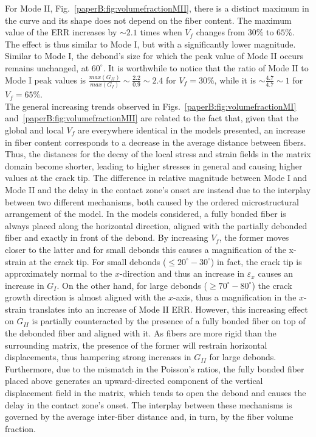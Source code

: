 For Mode II, Fig.~\ref{paperB:fig:volumefractionMII}, there is a distinct maximum in the curve and its shape does not depend on the fiber content. The maximum value of the ERR increases by $\sim 2.1$ times when $V_{f}$ changes from $30\%$ to $65\%$. The effect is thus similar to Mode I, but with a significantly lower magnitude. Similar to Mode I, the debond's size for which the peak value of Mode II occurs remains unchanged, at $60^{\circ}$. It is worthwhile to notice that the ratio of Mode II to Mode I peak values is $\frac{max\left(G_{II}\right)}{max\left(G_{I}\right)}\sim\frac{2.2}{0.9}\sim 2.4$ for $V_{f}=30\%$, while it is $\sim\frac{4.7}{4.7}\sim 1$ for $V_{f}=65\%$.\\%
The general increasing trends observed in Figs.~\ref{paperB:fig:volumefractionMI} and~\ref{paperB:fig:volumefractionMII} are related to the fact that, given that the global and local $V_{f}$ are everywhere identical in the models presented, an increase in fiber content corresponds to a decrease in the average distance between fibers. Thus, the distances for the decay of the local stress and strain fields in the matrix domain become shorter, leading to higher stresses in general and causing higher values at the crack tip. The difference in relative magnitude between Mode I and Mode II and the delay in the contact zone's onset are instead due to the interplay between two different mechanisms, both caused by the ordered microstructural arrangement of the model. In the models considered, a fully bonded fiber is always placed along the horizontal direction, aligned with the partially debonded fiber and exactly in front of the debond. By increasing $V_{f}$, the former moves closer to the latter and for small debonds this causes a magnification of the x-strain at the crack tip. For small debonds ($\leq 20^{\circ}-30^{\circ}$) in fact, the crack tip is approximately normal to the $x$-direction and thus an increase in $\varepsilon_{x}$ causes an increase in $G_{I}$. On the other hand, for large debonds ($\geq 70^{\circ}-80^{\circ}$) the crack growth direction is almost aligned with the $x$-axis, thus a magnification in the $x$-strain translates into an increase of Mode II ERR. However, this increasing effect on $G_{II}$ is partially counteracted by the presence of a fully bonded fiber on top of the debonded fiber and aligned with it. As fibers are more rigid than the surrounding matrix, the presence of the former will restrain horizontal displacements, thus hampering strong increases in $G_{II}$ for large debonds. Furthermore, due to the mismatch in the Poisson's ratios, the fully bonded fiber placed above generates an upward-directed component of the vertical displacement field in the matrix, which tends to open the debond and causes the delay in the contact zone's onset. The interplay between these mechanisms is governed by the average inter-fiber distance and, in turn, by the fiber volume fraction.\\
